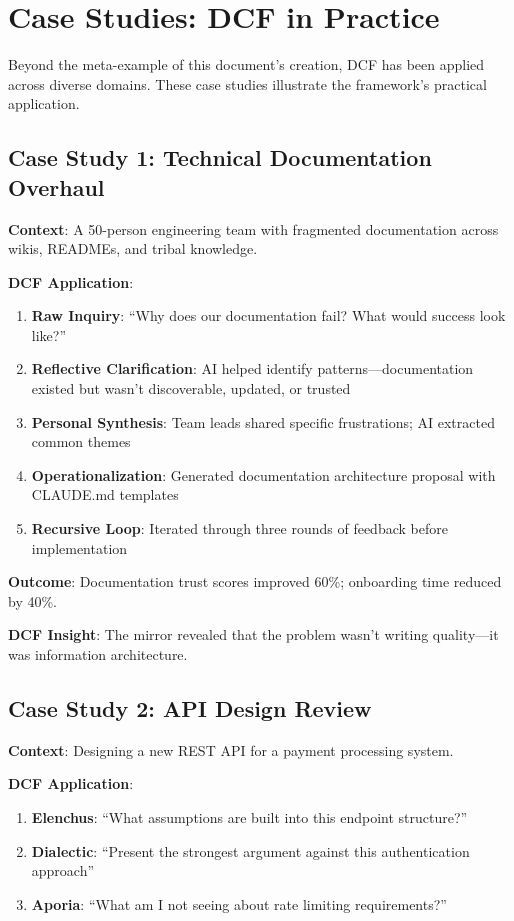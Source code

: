 \chapter{Case Studies: DCF in Practice}

Beyond the meta-example of this document's creation, DCF has been applied across diverse domains. These case studies illustrate the framework's practical application.

\section{Case Study 1: Technical Documentation Overhaul}

\textbf{Context}: A 50-person engineering team with fragmented documentation across wikis, READMEs, and tribal knowledge.

\textbf{DCF Application}:
\begin{enumerate}
    \item \textbf{Raw Inquiry}: ``Why does our documentation fail? What would success look like?''
    \item \textbf{Reflective Clarification}: AI helped identify patterns---documentation existed but wasn't discoverable, updated, or trusted
    \item \textbf{Personal Synthesis}: Team leads shared specific frustrations; AI extracted common themes
    \item \textbf{Operationalization}: Generated documentation architecture proposal with CLAUDE.md templates
    \item \textbf{Recursive Loop}: Iterated through three rounds of feedback before implementation
\end{enumerate}

\textbf{Outcome}: Documentation trust scores improved 60\%; onboarding time reduced by 40\%.

\textbf{DCF Insight}: The mirror revealed that the problem wasn't writing quality---it was information architecture.

\section{Case Study 2: API Design Review}

\textbf{Context}: Designing a new REST API for a payment processing system.

\textbf{DCF Application}:
\begin{enumerate}
    \item \textbf{Elenchus}: ``What assumptions are built into this endpoint structure?''
    \item \textbf{Dialectic}: ``Present the strongest argument against this authentication approach''
    \item \textbf{Aporia}: ``What am I not seeing about rate limiting requirements?''
\end{enumerate}

